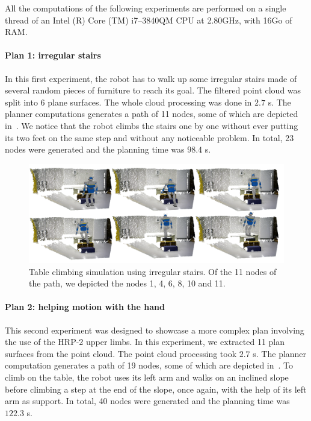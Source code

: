 All the computations of the following experiments are performed on a single thread of an Intel (R) Core (TM) i7--3840QM CPU at 2.80GHz, with 16Go of RAM\@.

\paragraph{Plan 1: irregular stairs}
In this first experiment, the robot has to walk up some irregular stairs made of several random pieces of furniture to reach its goal.
The filtered point cloud was split into 6 plane surfaces.
The whole cloud processing was done in $2.7$ s.
The planner computations generates a path of 11 nodes, some of which are depicted in~.
We notice that the robot climbs the stairs one by one without ever putting its two feet on the same step and without any noticeable problem.
In total, 23 nodes were generated and the planning time was $98.4$ s.

\begin{figure}
  \centering
  \includegraphics[width=\linewidth]{hrp2stairs.png}
  \caption{Table climbing simulation using irregular stairs. Of the 11 nodes of the path, we depicted the nodes 1, 4, 6, 8, 10 and 11.}
\label{fig:table-climbing-simulation-stair}
\end{figure}

\paragraph{Plan 2: helping motion with the hand}
This second experiment was designed to showcase a more complex plan involving the use of the HRP-2 upper limbs.
In this experiment, we extracted 11 plan surfaces from the point cloud.
The point cloud processing took $2.7$ s.
The planner computation generates a path of 19 nodes, some of which are depicted in~.
To climb on the table, the robot uses its left arm and walks on an inclined slope before climbing a step at the end of the slope, once again, with the help of its left arm as support.
In total, 40 nodes were generated and the planning time was $122.3$ s.

